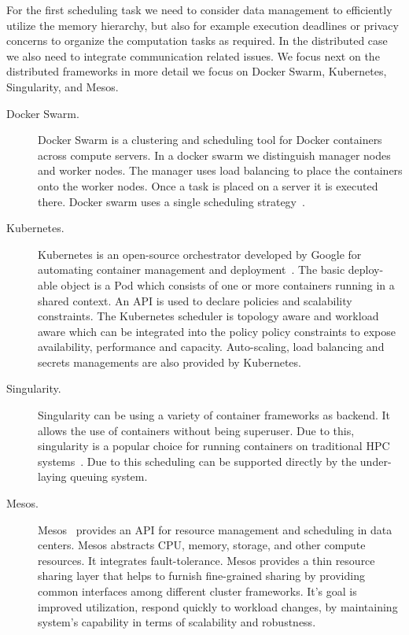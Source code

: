 \documentclass[final,5p,times,twocolumn]{elsarticle}
\begin{document}
For the first scheduling task we need to consider data management to
efficiently utilize the memory hierarchy, but also for example
execution deadlines or privacy concerns to organize the computation
tasks as required. In the distributed case we also need to integrate
communication related issues. We focus next on the distributed
frameworks in more detail we focus on Docker Swarm, Kubernetes,
Singularity, and Mesos.

\begin{description}


\item[Docker Swarm.] Docker Swarm is a clustering and scheduling
tool for Docker containers~\cite{Dockerswarmengine2018} across compute
servers. In a docker swarm we distinguish manager nodes and worker
nodes. The manager uses load balancing to place the containers onto
the worker nodes. Once a task is placed on a server it is executed
there.  Docker swarm uses a single scheduling
strategy~\cite{Dockerswarm2018}.



\item[Kubernetes.] Kubernetes is an open-source orchestrator
developed by Google for automating container management and
deployment~\cite{Kubernates2018}. The basic deploy-able object is a
Pod which consists of one or more containers running in a shared
context. An API is used to declare policies and scalability
constraints. The Kubernetes scheduler is topology aware and workload
aware which can be integrated into the policy policy constraints to
expose availability, performance and capacity. Auto-scaling, load
balancing and secrets managements are also provided by Kubernetes.

\item[Singularity.] Singularity can be using a variety of
container frameworks as backend. It allows the use of containers
without being superuser. Due to this, singularity is a popular choice
for running containers on traditional HPC
systems~\cite{www-singularity}. Due to this scheduling can be
supported directly by the under-laying queuing system.


\item[Mesos.] Mesos~\cite{hindman2011mesos,Mesos2018} provides an
API for resource management and scheduling in data centers. Mesos
abstracts CPU, memory, storage, and other compute resources. It
integrates fault-tolerance. Mesos provides a thin resource sharing
layer that helps to furnish fine-grained sharing by providing common
interfaces among different cluster frameworks. It's goal is improved
utilization, respond quickly to workload changes, by maintaining
system's capability in terms of scalability and robustness.



\end{description}
\end{document}
